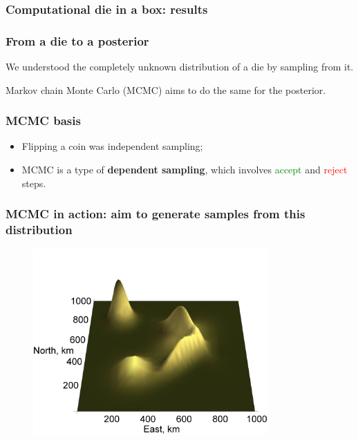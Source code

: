 \documentclass[handout]{beamer}
\begin{document}
\begin{frame}
	\frametitle{Computational die in a box: results}
	
	\begin{figure}[t]
		\centerline{}
	\end{figure}
	
\end{frame}

\begin{frame}
	\frametitle{From a die to a posterior}
	
	We understood the completely unknown distribution of a die by sampling from it.
	
	\vspace{0.5cm}
	
	Markov chain Monte Carlo (MCMC) aims to do the same for the posterior.
	
\end{frame}

\begin{frame}
	\frametitle{MCMC basis}
	
	\begin{itemize}
		\item Flipping a coin was independent sampling;
		\item MCMC is a type of \textbf{dependent sampling}, which involves \textcolor{green}{accept} and \textcolor{red}{reject} steps.
	\end{itemize}
	
\end{frame}

\begin{frame}
	\frametitle{MCMC in action: aim to generate samples from this distribution}
		\begin{figure}[ht]
			\centerline{\includegraphics[width=0.8\textwidth]{./Animations/lec4_goldMiningActual.png}}
		\end{figure}
	\end{frame}
	
\end{document}
